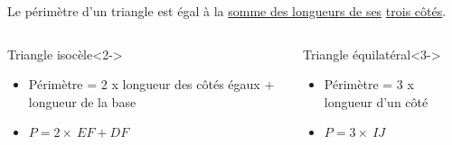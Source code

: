 \documentclass[xcolor=table]{beamer}
\begin{document}
\begin{frame}
	\frametitle{}  
	\framesubtitle{}	
	
		Le périmètre d'un triangle est égal à la \underline{somme des longueurs de ses} \underline{ trois côtés}.
	
	

	\begin{columns}[onlytextwidth]
		\begin{column}{0.48\textwidth}
			\begin{alertblock}{Triangle isocèle}<2->
				\begin{itemize}
					\item Périmètre = 2 x longueur des côtés égaux + longueur de la base
					\item $P = 2 \times\ EF + DF$
				\end{itemize}
				
			\end{alertblock}
		\end{column}
		\begin{column}{0.48\textwidth}
			\begin{alertblock}{Triangle équilatéral}<3->
				\begin{itemize}
					\item Périmètre = 3 x longueur d'un côté
					\item $P = 3 \times\ IJ $
				\end{itemize}
				
			\end{alertblock}
		\end{column}
	\end{columns}
	
	
\end{frame}
\end{document}
